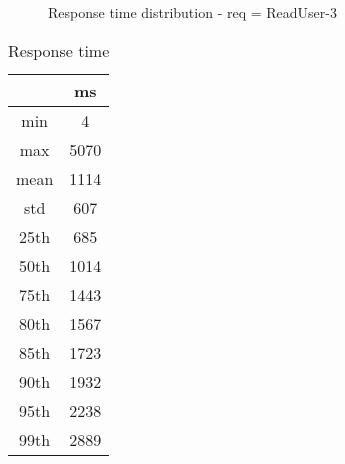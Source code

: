 \begin{minipage}{0.75\linewidth}
\begin{figure}[h]
\begin{adjustbox}{max width=1.0\linewidth, keepaspectratio}
  \end{adjustbox}
  \caption{Response time distribution - req = ReadUser-3}
\end{figure}
\end{minipage}\hfill\begin{minipage}{0.18\linewidth}
\begin{table}[h]
\begin{tabular}{|cc|}
\hline
\textbf{} & \textbf{ms}\\ \hline
 \Xhline{0.005\arrayrulewidth}
min & 4\\
 \Xhline{0.005\arrayrulewidth}
max & 5070\\
 \Xhline{0.005\arrayrulewidth}
mean & 1114\\
 \Xhline{0.005\arrayrulewidth}
std & 607\\
\hline
\hline
 \Xhline{0.005\arrayrulewidth}
25th & 685\\
 \Xhline{0.005\arrayrulewidth}
50th & 1014\\
 \Xhline{0.005\arrayrulewidth}
75th & 1443\\
 \Xhline{0.005\arrayrulewidth}
80th & 1567\\
 \Xhline{0.005\arrayrulewidth}
85th & 1723\\
 \Xhline{0.005\arrayrulewidth}
90th & 1932\\
 \Xhline{0.005\arrayrulewidth}
95th & 2238\\
 \Xhline{0.005\arrayrulewidth}
99th & 2889\\
\hline
\end{tabular}
\caption{Response time}
\end{table}
\end{minipage}\hfill